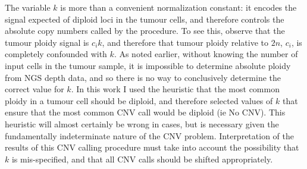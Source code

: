 \documentclass[thesis.tex]{subfiles}
\begin{document}
The variable $k$ is more than a convenient normalization constant: it encodes the signal expected of diploid loci in the tumour cells, and therefore controls the absolute copy numbers called by the procedure.  To see this, observe that the tumour ploidy signal is $c_i k$, and therefore that tumour ploidy relative to $2n$, $c_i$, is completely confounded with $k$.  As noted earlier, without knowing the number of input cells in the tumour sample, it is impossible to determine absolute ploidy from \gls{NGS} depth data, and so there is no way to conclusively determine the correct value for $k$.  In this work I used the heuristic that the most common ploidy in a tumour cell should be diploid, and therefore selected values of $k$ that ensure that the most common \gls{CNV} call would be diploid (ie No CNV).  This heuristic will almost certainly be wrong in cases, but is necessary given the fundamentally indeterminate nature of the \gls{CNV} problem.  Interpretation of the results of this \gls{CNV} calling procedure must take into account the possibility that $k$ is mis-specified, and that all CNV calls should be shifted appropriately.
\end{document}
